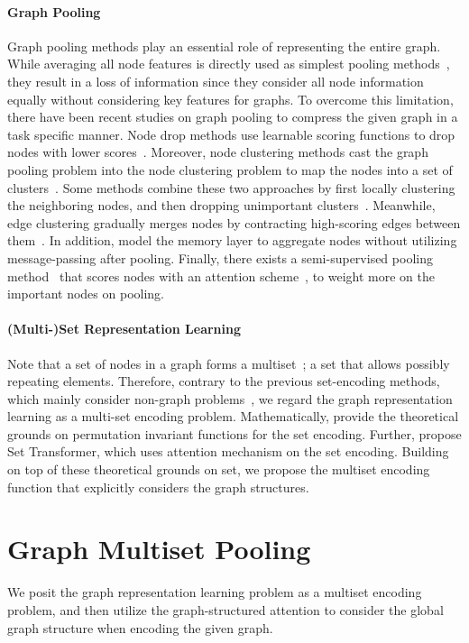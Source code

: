\documentclass{article} \usepackage{iclr2021_conference,times}
\begin{document}
\paragraph{Graph Pooling}
Graph pooling methods play an essential role of representing the entire graph. While averaging all node features is directly used as simplest pooling methods~\citep{avg/pooling/1, avg/pooling/2}, they result in a loss of information since they consider all node information equally without considering key features for graphs. To overcome this limitation, there have been recent studies on graph pooling to compress the given graph in a task specific manner. Node drop methods use learnable scoring functions to drop nodes with lower scores~\citep{SortPool, TopKPool, SAGPool}. Moreover, node clustering methods cast the graph pooling problem into the node clustering problem to map the nodes into a set of clusters~\citep{DiffPool, EigenPool, HaarPool, MincutPool, StructPool}. Some methods combine these two approaches by first locally clustering the neighboring nodes, and then dropping unimportant clusters~\citep{ASAP}. Meanwhile, edge clustering gradually merges nodes by contracting high-scoring edges between them~\citep{edgepool}. In addition, \cite{Memory/GNN} model the memory layer to aggregate nodes without utilizing message-passing after pooling. Finally, there exists a semi-supervised pooling method~\citep{semi-hi/classification} that scores nodes with an attention scheme~\citep{attention/not/attention}, to weight more on the important nodes on pooling.

\vspace{-0.03in}
\paragraph{(Multi-)Set Representation Learning}
Note that a set of nodes in a graph forms a multiset~\citep{GIN}; a set that allows possibly repeating elements. Therefore, contrary to the previous set-encoding methods, which mainly consider non-graph problems~\citep{Set/3D/2, Set/pointcloud/2, Set/fewshot/2}, we regard the graph representation learning as a multi-set encoding problem. Mathematically, \cite{deepsets, deepsets/max} provide the theoretical grounds on permutation invariant functions for the set encoding. Further, \cite{SetTransformer} propose Set Transformer, which uses attention mechanism on the set encoding. Building on top of these theoretical grounds on set, we propose the multiset encoding function that explicitly considers the graph structures.
 \section{Graph Multiset Pooling}
We posit the graph representation learning problem as a multiset encoding problem, and then utilize the graph-structured attention to consider the global graph structure when encoding the given graph.
\end{document}

